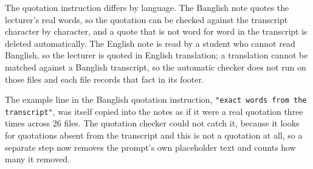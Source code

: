 The quotation instruction differs by language. The Banglish note quotes the lecturer's
real words, so the quotation can be checked against the transcript character by character,
and a quote that is not word for word in the transcript is deleted automatically. The
English note is read by a student who cannot read Banglish, so the lecturer is quoted in
English translation; a translation cannot be matched against a Banglish transcript, so the
automatic checker does not run on those files and each file records that fact in its
footer.

The example line in the Banglish quotation instruction, \texttt{"exact words from the
transcript"}, was itself copied into the notes as if it were a real quotation three times
across 26 files. The quotation checker could not catch it, because it looks for quotations
absent from the transcript and this is not a quotation at all, so a separate step now
removes the prompt's own placeholder text and counts how many it removed.
